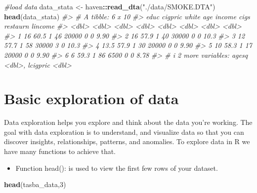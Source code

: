 \documentclass[
]{book}
\newenvironment{Shaded}{\begin{snugshade}}{\end{snugshade}}
\newcommand{\CommentTok}[1]{\textcolor[rgb]{0.56,0.35,0.01}{\textit{#1}}}
\newcommand{\DecValTok}[1]{\textcolor[rgb]{0.00,0.00,0.81}{#1}}
\newcommand{\FunctionTok}[1]{\textcolor[rgb]{0.13,0.29,0.53}{\textbf{#1}}}
\newcommand{\NormalTok}[1]{#1}
\newcommand{\OtherTok}[1]{\textcolor[rgb]{0.56,0.35,0.01}{#1}}
\newcommand{\SpecialCharTok}[1]{\textcolor[rgb]{0.81,0.36,0.00}{\textbf{#1}}}
\newcommand{\StringTok}[1]{\textcolor[rgb]{0.31,0.60,0.02}{#1}}
\providecommand{\tightlist}{%
  \setlength{\itemsep}{0pt}\setlength{\parskip}{0pt}}
\begin{document}
\begin{Shaded}
\begin{Highlighting}[]
\CommentTok{\#load data}
\NormalTok{data\_stata }\OtherTok{\textless{}{-}}\NormalTok{ haven}\SpecialCharTok{::}\FunctionTok{read\_dta}\NormalTok{(}\StringTok{"./data/SMOKE.DTA"}\NormalTok{)}
\FunctionTok{head}\NormalTok{(data\_stata)}
\CommentTok{\#\textgreater{} \# A tibble: 6 x 10}
\CommentTok{\#\textgreater{}    educ cigpric white   age income  cigs restaurn lincome}
\CommentTok{\#\textgreater{}   \textless{}dbl\textgreater{}   \textless{}dbl\textgreater{} \textless{}dbl\textgreater{} \textless{}dbl\textgreater{}  \textless{}dbl\textgreater{} \textless{}dbl\textgreater{}    \textless{}dbl\textgreater{}   \textless{}dbl\textgreater{}}
\CommentTok{\#\textgreater{} 1  16      60.5     1    46  20000     0        0    9.90}
\CommentTok{\#\textgreater{} 2  16      57.9     1    40  30000     0        0   10.3 }
\CommentTok{\#\textgreater{} 3  12      57.7     1    58  30000     3        0   10.3 }
\CommentTok{\#\textgreater{} 4  13.5    57.9     1    30  20000     0        0    9.90}
\CommentTok{\#\textgreater{} 5  10      58.3     1    17  20000     0        0    9.90}
\CommentTok{\#\textgreater{} 6   6      59.3     1    86   6500     0        0    8.78}
\CommentTok{\#\textgreater{} \# i 2 more variables: agesq \textless{}dbl\textgreater{}, lcigpric \textless{}dbl\textgreater{}}
\end{Highlighting}
\end{Shaded}

\hypertarget{basic-exploration-of-data}{%
\section{Basic exploration of data}\label{basic-exploration-of-data}}

Data exploration helps you explore and think about the data you're working. The goal with data exploration is to understand, and visualize data so that you can discover insights, relationships, patterns, and anomalies.
To explore data in R we have many functions to achieve that.

\begin{itemize}
\tightlist
\item
  Function head(): is used to view the first few rows of your dataset.
\end{itemize}

\begin{Shaded}
\begin{Highlighting}[]
\FunctionTok{head}\NormalTok{(tasba\_data,}\DecValTok{3}\NormalTok{)}
\end{Highlighting}
\end{Shaded}
\end{document}
